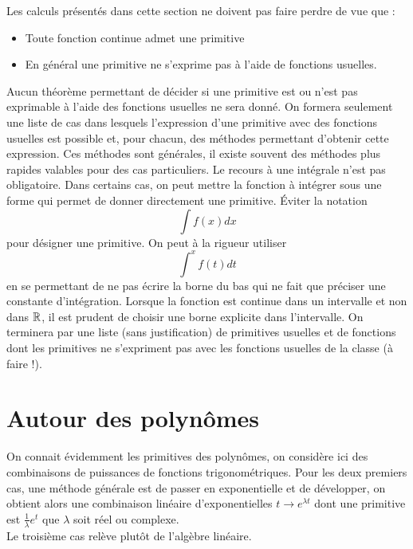 

Les calculs présentés dans cette section ne doivent pas faire perdre de vue que :
\begin{itemize}
 \item Toute fonction continue admet une primitive
 \item En général une primitive ne s'exprime pas à l'aide de fonctions \og usuelles\fg.
\end{itemize}
Aucun théorème permettant de décider si une primitive est ou n'est pas exprimable à l'aide des fonctions usuelles ne sera donné. On formera seulement une liste de cas dans lesquels l'expression d'une primitive avec des fonctions usuelles est possible et, pour chacun, des méthodes permettant d'obtenir cette expression. Ces méthodes sont générales, il existe souvent des méthodes plus rapides valables pour des cas particuliers.\newline
Le recours à une intégrale n'est pas obligatoire. Dans certains cas, on peut mettre la fonction à intégrer sous une forme qui permet de donner directement une primitive.\newline
\'Eviter la notation
\begin{displaymath}
 \int f(x)dx
\end{displaymath}
pour désigner une primitive. On peut à la rigueur utiliser
\begin{displaymath}
 \int^x f(t)dt
\end{displaymath}
en se permettant de ne pas écrire la borne du bas qui ne fait que préciser une constante d'intégration. Lorsque la fonction est continue dans un intervalle et non dans $\mathbb{R}$, il est prudent de choisir une borne explicite dans l'intervalle.
On terminera par une liste (sans justification) de primitives usuelles et de fonctions dont les primitives ne s'expriment pas avec les fonctions usuelles de la classe (à faire !).

\section{Autour des polynômes}
On connait évidemment les primitives des polynômes, on considère ici des combinaisons de puissances de fonctions trigonométriques. Pour les deux premiers cas, une méthode générale est de passer en exponentielle et de développer, on obtient alors une combinaison linéaire d'exponentielles $t\rightarrow e^{\lambda t}$ dont une primitive est $\frac{1}{\lambda}e^t$ que $\lambda$ soit réel ou complexe.\\
Le troisième cas relève plutôt de l'algèbre linéaire.

